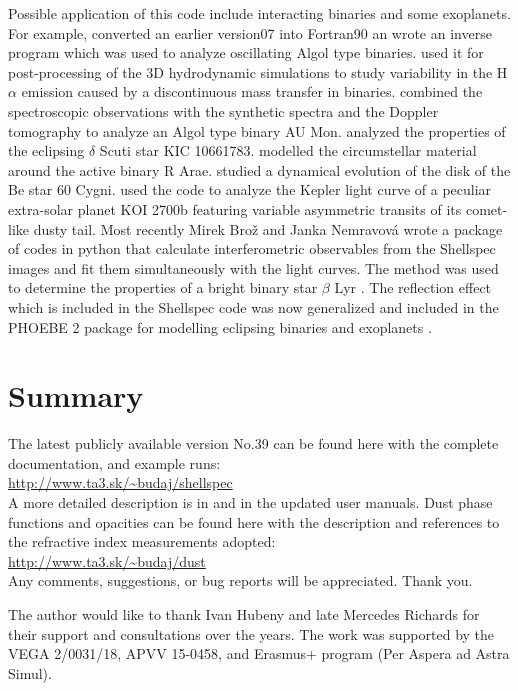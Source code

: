 \documentclass[11pt,twoside]{article}
\begin{document}
Possible application of this code include interacting binaries
\citep{budaj05,ghoreyshi11,gorlova12,bozic13,richards14}
and some exoplanets. 
For example,
\cite{tkachenko09,tkachenko10} converted an earlier version07
into Fortran90 an wrote an inverse program which was used to analyze
oscillating Algol type binaries.
\cite{chadima11} used it for post-processing of the 3D hydrodynamic 
simulations to study variability in the H{$\alpha$} emission
caused by a discontinuous mass transfer in binaries.
\cite{atwood12} combined the spectroscopic observations with 
the synthetic spectra and the Doppler tomography to analyze 
an Algol type binary AU Mon.
\cite{lehmann13} analyzed the properties of the eclipsing 
{$\delta$} Scuti star KIC 10661783.
\cite{bakis16} modelled the circumstellar material around the active 
binary R Arae.
\cite{sejnova16} studied a dynamical evolution of the disk of the Be 
star 60 Cygni.
\cite{garai18} used the code to analyze the Kepler light curve
of a peculiar extra-solar planet KOI 2700b featuring
variable asymmetric transits of its comet-like dusty tail.
Most recently Mirek Bro\v{z} and Janka Nemravov\'{a} wrote a package of 
codes in python that calculate interferometric observables from 
the Shellspec images and fit them simultaneously with the light curves.
The method was used to determine the properties of a bright binary
star $\beta$ Lyr \citep{mourard18}.
The reflection effect which is included in the Shellspec code 
\citep{budaj11} was now generalized and included in the PHOEBE 2
package for modelling eclipsing binaries and exoplanets 
\citep{horvat18}.


\section{Summary}

The latest publicly available version No.39 can be found here with 
the complete documentation, and example runs:\\
\url{http://www.ta3.sk/~budaj/shellspec}\\
A more detailed description is in \cite{budaj04} and in the updated
user manuals.
Dust phase functions and opacities can be found here with 
the description and references to the refractive index measurements 
adopted:\\
\url{http://www.ta3.sk/~budaj/dust}\\
Any comments, suggestions, or bug reports will be appreciated.
Thank you.


\acknowledgements The author would like to thank Ivan Hubeny
and late Mercedes Richards for their support and consultations over 
the years. The work was supported by the VEGA 2/0031/18,
APVV 15-0458, and Erasmus+ program (Per Aspera ad Astra Simul).


{}  %
\end{document}
